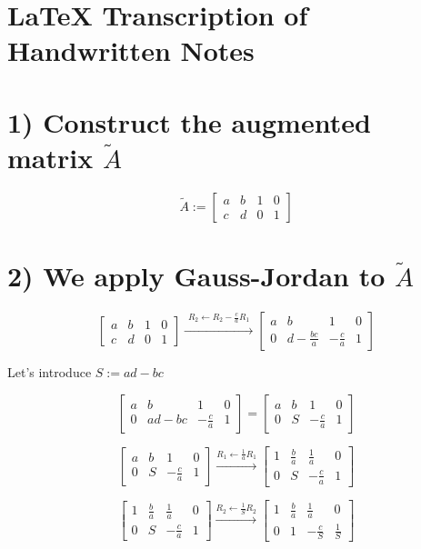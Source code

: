\section{LaTeX Transcription of Handwritten Notes}
\author{Transcription}



\section*{1) Construct the augmented matrix \(\widetilde{A}\)}
\[\widetilde{A} := \begin{bmatrix}
a & b & 1 & 0 \\
c & d & 0 & 1
\end{bmatrix}\]

\section*{2) We apply Gauss-Jordan to \(\widetilde{A}\)}
\[\begin{bmatrix}
a & b & 1 & 0 \\
c & d & 0 & 1
\end{bmatrix} \xrightarrow{\substack{R_2 \leftarrow R_2 - \frac{c}{a}R_1}}
\begin{bmatrix}
a & b & 1 & 0 \\
0 & d-\frac{bc}{a} & -\frac{c}{a} & 1
\end{bmatrix}\]

Let's introduce \(S := ad - bc\)

\[\begin{bmatrix}
a & b & 1 & 0 \\
0 & ad-bc & -\frac{c}{a} & 1
\end{bmatrix} = \begin{bmatrix}
a & b & 1 & 0 \\
0 & S & -\frac{c}{a} & 1
\end{bmatrix}\]

\[\begin{bmatrix}
a & b & 1 & 0 \\
0 & S & -\frac{c}{a} & 1
\end{bmatrix} \xrightarrow{R_1 \leftarrow \frac{1}{a}R_1}
\begin{bmatrix}
1 & \frac{b}{a} & \frac{1}{a} & 0 \\
0 & S & -\frac{c}{a} & 1
\end{bmatrix}\]

\[\begin{bmatrix}
1 & \frac{b}{a} & \frac{1}{a} & 0 \\
0 & S & -\frac{c}{a} & 1
\end{bmatrix} \xrightarrow{R_2 \leftarrow \frac{1}{S}R_2}
\begin{bmatrix}
1 & \frac{b}{a} & \frac{1}{a} & 0 \\
0 & 1 & -\frac{c}{S} & \frac{1}{S}
\end{bmatrix}\]


